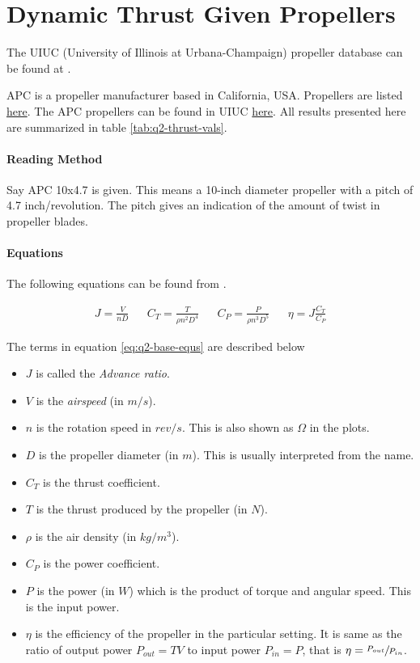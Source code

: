 \section{Dynamic Thrust Given Propellers}

The UIUC (University of Illinois at Urbana-Champaign) propeller database can be found at \cite{uiuc-database}.

\noindent
APC is a propeller manufacturer based in California, USA. Propellers are listed \href{https://www.apcprop.com/product-category/multi-copters-drones/}{here}. The APC propellers can be found in UIUC \href{https://m-selig.ae.illinois.edu/props/volume-1/propDB-volume-1.html#APC}{here}. All results presented here are summarized in table \ref{tab:q2-thrust-vals}.

\paragraph*{Reading Method}
Say APC 10x4.7 is given. This means a 10-inch diameter propeller with a pitch of 4.7 inch/revolution. The pitch gives an indication of the amount of twist in propeller blades.

\paragraph*{Equations}
The following equations can be found from \cite{brandt2011propeller,aerotrash-uiuc-article,uiuc-data-equs}.

\begin{align}
    J = \frac{V}{nD} &&
    C_{T} = \frac{T}{\rho n^2 D^4} &&
    C_{P} = \frac{P}{\rho n^3 D^5} &&
    \eta = J \frac{C_T}{C_P}
    \label{eq:q2-base-equs}
\end{align}

The terms in equation \ref{eq:q2-base-equs} are described below

\begin{itemize}
    \item $J$ is called the \emph{Advance ratio}.
    \item $V$ is the \emph{airspeed} (in $m/s$).
    \item $n$ is the rotation speed in $rev/s$. This is also shown as $\Omega$ in the plots.
    \item $D$ is the propeller diameter (in $m$). This is usually interpreted from the name.
    \item $C_T$ is the thrust coefficient.
    \item $T$ is the thrust produced by the propeller (in $N$).
    \item $\rho$ is the air density (in $kg/m^3$).
    \item $C_P$ is the power coefficient.
    \item $P$ is the power (in $W$) which is the product of torque and angular speed. This is the input power.
    \item $\eta$ is the efficiency of the propeller in the particular setting. It is same as the ratio of output power $P_{out} = TV$ to input power $P_{in} = P$, that is $\eta = \sfrac{P_{out}}{P_{in}}$.
\end{itemize}

